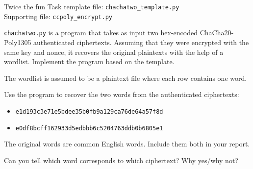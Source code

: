 \documentclass{homework}
\begin{document}
\begin{task}{Twice the fun}
  Task template file: \texttt{chachatwo\_template.py}\\
  Supporting file: \texttt{ccpoly\_encrypt.py}

  \texttt{chachatwo.py} is a program that takes as input two hex-encoded ChaCha20-Poly1305 authenticated ciphertexts.
  Assuming that they were encrypted with the same key and nonce, it recovers the original plaintexts with the help of a wordlist.
  Implement the program based on the template.

  The wordlist is assumed to be a plaintext file where each row contains one word.

  Use the program to recover the two words from the authenticated ciphertexts:
  \begin{itemize}
  \item \texttt{e1d193c3e71e5bdee35b0fb9a129ca76de64a57f8d}
  \item \texttt{e0df8bcff162933d5edbbb6c5204763ddb0b6805e1}
  \end{itemize}
  The original words are common English words.
  Include them both in your report.

  Can you tell which word corresponds to which ciphertext?
  Why yes/why not?
\end{task}
\end{document}
